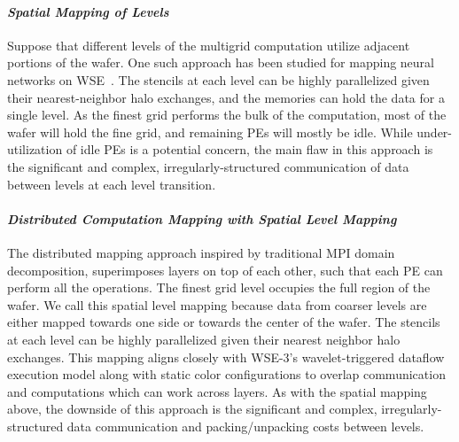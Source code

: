 \documentclass[conference]{IEEEtran}
\begin{document}
\paragraph{\textit{Spatial Mapping of Levels}} Suppose that different levels of the multigrid computation utilize adjacent portions of the wafer. 
            One such approach has been studied for mapping neural networks on WSE~\cite{cerebras_execution_modes,cerebras_pipeline_dl}.  %
            The stencils at each level can be highly parallelized given their nearest-neighbor halo exchanges, and the memories can hold the data for a single level.  As the finest grid performs the bulk of the computation, most of the wafer will hold the fine grid, and remaining PEs will mostly be idle.  While under-utilization of idle PEs is a potential concern, the main flaw in this approach %
            is the significant and complex, irregularly-structured communication of data between levels
            at each level transition.

            \paragraph{\textit{Distributed Computation Mapping with Spatial Level Mapping}}
            The distributed mapping approach inspired by traditional MPI domain decomposition, superimposes layers on top of each other, such that each PE can perform all the operations.
            The finest grid level occupies the full region of the wafer.  We call this spatial level mapping because data from coarser levels are either mapped towards one side or towards the center of the wafer. The stencils at each level can be highly parallelized given their nearest neighbor halo exchanges.
            This mapping aligns closely with WSE-3's wavelet-triggered dataflow execution model along with static color configurations to overlap communication and computations which can work across layers. %
            As with the spatial mapping above, the downside of this approach is the significant and complex, irregularly-structured data communication and packing/unpacking costs between levels.
\end{document}
